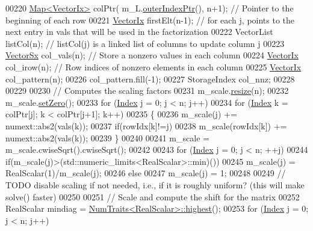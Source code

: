 \begin{DoxyCode}
00220   \hyperlink{group___core___module_class_eigen_1_1_map}{Map<VectorIx>} colPtr( m\_L.\hyperlink{group___sparse_core___module_a75506964d86d6badb32d0b4917acf2e2}{outerIndexPtr}(), n+1); \textcolor{comment}{// Pointer to the beginning of
       each row}
00221   \hyperlink{group___core___module}{VectorIx} firstElt(n-1); \textcolor{comment}{// for each j, points to the next entry in vals that will be used in the
       factorization}
00222   VectorList listCol(n);  \textcolor{comment}{// listCol(j) is a linked list of columns to update column j}
00223   \hyperlink{group___core___module}{VectorSx} col\_vals(n);   \textcolor{comment}{// Store a  nonzero values in each column}
00224   \hyperlink{group___core___module}{VectorIx} col\_irow(n);   \textcolor{comment}{// Row indices of nonzero elements in each column}
00225   \hyperlink{group___core___module}{VectorIx} col\_pattern(n);
00226   col\_pattern.fill(-1);
00227   StorageIndex col\_nnz;
00228   
00229   
00230   \textcolor{comment}{// Computes the scaling factors }
00231   m\_scale.\hyperlink{class_eigen_1_1_plain_object_base_a99d9054ee2d5a40c6e00ded0265e9cea}{resize}(n);
00232   m\_scale.\hyperlink{class_eigen_1_1_plain_object_base_ac21ad5f989f320e46958b75ac8d9a1da}{setZero}();
00233   \textcolor{keywordflow}{for} (\hyperlink{namespace_eigen_a62e77e0933482dafde8fe197d9a2cfde}{Index} j = 0; j < n; j++)
00234     \textcolor{keywordflow}{for} (\hyperlink{namespace_eigen_a62e77e0933482dafde8fe197d9a2cfde}{Index} k = colPtr[j]; k < colPtr[j+1]; k++)
00235     \{
00236       m\_scale(j) += numext::abs2(vals(k));
00237       \textcolor{keywordflow}{if}(rowIdx[k]!=j)
00238         m\_scale(rowIdx[k]) += numext::abs2(vals(k));
00239     \}
00240   
00241   m\_scale = m\_scale.cwiseSqrt().cwiseSqrt();
00242 
00243   \textcolor{keywordflow}{for} (\hyperlink{namespace_eigen_a62e77e0933482dafde8fe197d9a2cfde}{Index} j = 0; j < n; ++j)
00244     \textcolor{keywordflow}{if}(m\_scale(j)>(std::numeric\_limits<RealScalar>::min)())
00245       m\_scale(j) = RealScalar(1)/m\_scale(j);
00246     \textcolor{keywordflow}{else}
00247       m\_scale(j) = 1;
00248 
00249   \textcolor{comment}{// TODO disable scaling if not needed, i.e., if it is roughly uniform? (this will make solve() faster)}
00250   
00251   \textcolor{comment}{// Scale and compute the shift for the matrix }
00252   RealScalar mindiag = \hyperlink{group___core___module_struct_eigen_1_1_num_traits}{NumTraits<RealScalar>::highest}();
00253   \textcolor{keywordflow}{for} (\hyperlink{namespace_eigen_a62e77e0933482dafde8fe197d9a2cfde}{Index} j = 0; j < n; j++)

\end{DoxyCode}
